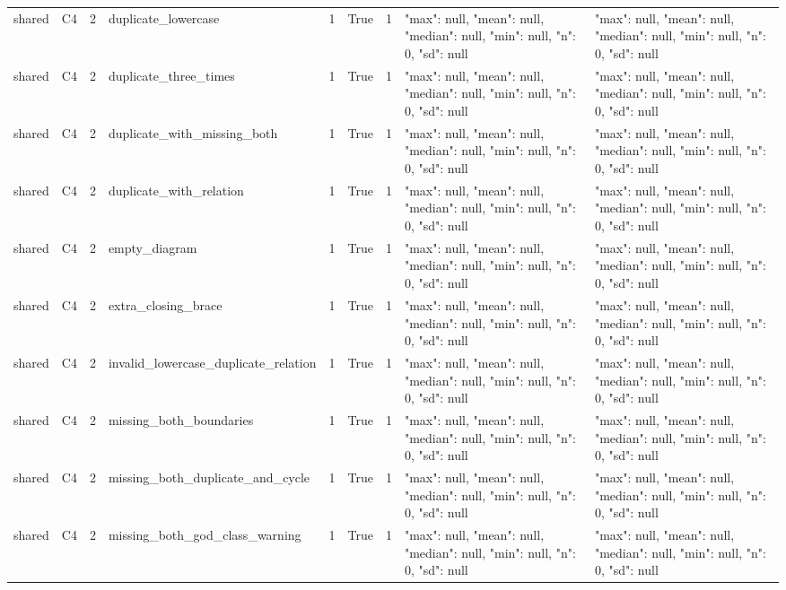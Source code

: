 \begin{tabular}{lllllllll}
shared & C4 & 2 & duplicate\_lowercase & 1 & True & 1 & {"max": null, "mean": null, "median": null, "min": null, "n": 0, "sd": null} & {"max": null, "mean": null, "median": null, "min": null, "n": 0, "sd": null} \\
shared & C4 & 2 & duplicate\_three\_times & 1 & True & 1 & {"max": null, "mean": null, "median": null, "min": null, "n": 0, "sd": null} & {"max": null, "mean": null, "median": null, "min": null, "n": 0, "sd": null} \\
shared & C4 & 2 & duplicate\_with\_missing\_both & 1 & True & 1 & {"max": null, "mean": null, "median": null, "min": null, "n": 0, "sd": null} & {"max": null, "mean": null, "median": null, "min": null, "n": 0, "sd": null} \\
shared & C4 & 2 & duplicate\_with\_relation & 1 & True & 1 & {"max": null, "mean": null, "median": null, "min": null, "n": 0, "sd": null} & {"max": null, "mean": null, "median": null, "min": null, "n": 0, "sd": null} \\
shared & C4 & 2 & empty\_diagram & 1 & True & 1 & {"max": null, "mean": null, "median": null, "min": null, "n": 0, "sd": null} & {"max": null, "mean": null, "median": null, "min": null, "n": 0, "sd": null} \\
shared & C4 & 2 & extra\_closing\_brace & 1 & True & 1 & {"max": null, "mean": null, "median": null, "min": null, "n": 0, "sd": null} & {"max": null, "mean": null, "median": null, "min": null, "n": 0, "sd": null} \\
shared & C4 & 2 & invalid\_lowercase\_duplicate\_relation & 1 & True & 1 & {"max": null, "mean": null, "median": null, "min": null, "n": 0, "sd": null} & {"max": null, "mean": null, "median": null, "min": null, "n": 0, "sd": null} \\
shared & C4 & 2 & missing\_both\_boundaries & 1 & True & 1 & {"max": null, "mean": null, "median": null, "min": null, "n": 0, "sd": null} & {"max": null, "mean": null, "median": null, "min": null, "n": 0, "sd": null} \\
shared & C4 & 2 & missing\_both\_duplicate\_and\_cycle & 1 & True & 1 & {"max": null, "mean": null, "median": null, "min": null, "n": 0, "sd": null} & {"max": null, "mean": null, "median": null, "min": null, "n": 0, "sd": null} \\
shared & C4 & 2 & missing\_both\_god\_class\_warning & 1 & True & 1 & {"max": null, "mean": null, "median": null, "min": null, "n": 0, "sd": null} & {"max": null, "mean": null, "median": null, "min": null, "n": 0, "sd": null} \\

\end{tabular}
